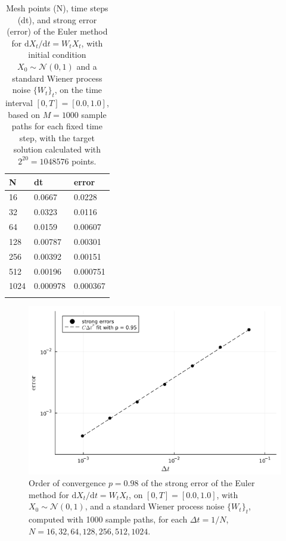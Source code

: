 \documentclass[reqno,12pt]{amsart}
\theoremstyle{plain}%
\theoremstyle{definition}
\begin{document}
\begin{table}
    \label{tablinearhomogeneousrode}
    \begin{tabular}[htb]{|l|l|l|}
    \hline N & dt & error\\
    \hline \hline
    16 & 0.0667 & 0.0228 \\
    32 & 0.0323 & 0.0116 \\
    64 & 0.0159 & 0.00607 \\
    128 & 0.00787 & 0.00301 \\
    256 & 0.00392 & 0.00151 \\
    512 & 0.00196 & 0.000751 \\
    1024 & 0.000978 & 0.000367 \\
    \hline \\
    \end{tabular}

    \caption{Mesh points (N), time steps (dt), and strong error (error) of the Euler method for $\mathrm{d}X_t/\mathrm{d}t = W_t X_t$, with initial condition $X_0 \sim \mathcal{N}(0, 1)$ and a standard Wiener process noise $\{W_t\}_t$, on the time interval $[0, T] = [0.0, 1.0]$, based on $M = 1000$ sample paths for each fixed time step, with the target solution calculated with $2^{20}=1048576$ points.}    
\end{table}

\begin{figure}[htb]
    \label{figlinearhomogeneousrode}
    \includegraphics[scale=0.7]{img/order_wienerhomogenous.png}
    \caption{Order of convergence $p = 0.98$ of the strong error of the Euler method for
    $\mathrm{d}X_t/\mathrm{d}t = W_t X_t$, on $[0, T] = [0.0, 1.0]$, with $X_0 \sim \mathcal{N}(0, 1)$,
    and a standard Wiener process noise $\{W_t\}_t$,
     computed with 1000 sample paths,
    for each $\Delta t = 1/N$,  $N = 16, 32, 64, 128, 256, 512, 1024$.
    }
\end{figure}
\end{document}
